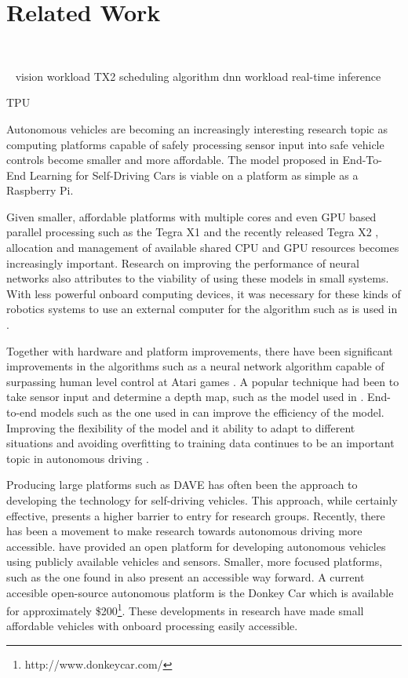 \section{Related Work}\label{sec:related}

\cite{Bojarski2016}

\cite{Kato:2015}
~\cite{shin2017project}
~\cite{upennf1tenth}

~\cite{Otterness2017} vision workload
\cite{Amert2017} TX2 scheduling algorithm
\cite{NVIDIA2015} dnn workload real-time inference

\cite{Jouppi2017} TPU

Autonomous vehicles are becoming an increasingly interesting research
topic as computing platforms capable of safely processing sensor input
into safe vehicle controls become smaller and more affordable.  The
model proposed in End-To-End Learning for Self-Driving Cars
\cite{Bojarski2016} is viable on a platform as simple as a Raspberry
Pi. 

Given smaller, affordable platforms with multiple cores and even GPU
based parallel processing such as the Tegra X1 \cite{NVIDIA2015} and
the recently released Tegra X2 \cite{Amert2017}, allocation and
management of available shared CPU and GPU resources \cite{Kim2016}
becomes increasingly important.  Research on improving the performance
of neural networks \cite{Jouppi2017} also attributes to the viability
of using these models in small systems.  With less powerful onboard
computing devices, it was necessary for these kinds of robotics
systems to use an external computer for the algorithm such as is used
in \cite{LeCun:2005}. 

Together with hardware and platform improvements, there have been
significant improvements in the algorithms such as a neural network
algorithm capable of surpassing human level control at Atari games
\cite{DBLP}.  A popular technique had been to take sensor input and
determine a depth map, such as the model used in
\cite{Michels:2005}. End-to-end models such as the one used in
\cite{Bojarski2016} can improve the efficiency of the model.
Improving the flexibility of the model and it ability to adapt to
different situations and avoiding overfitting to training data
continues to be an important topic in autonomous driving
\cite{Pomerleau1989}. 

Producing large platforms such as DAVE \cite{LeCun:04} has often been
the approach to developing the technology for self-driving vehicles.
This approach, while certainly effective, presents a higher barrier to
entry for research groups.  Recently, there has been a movement to
make research towards autonomous driving more accessible.
\cite{Kato:2015} have provided an open platform for developing
autonomous vehicles using publicly available vehicles and sensors.
Smaller, more focused platforms, such as the one found in
\cite{Michels:2005} also present an accessible way forward.  A current
accesible open-source autonomous platform is the Donkey Car which is
available for approximately \$200\footnote{http://www.donkeycar.com/}.
These developments in research have made small affordable vehicles with
onboard processing easily accessible.
